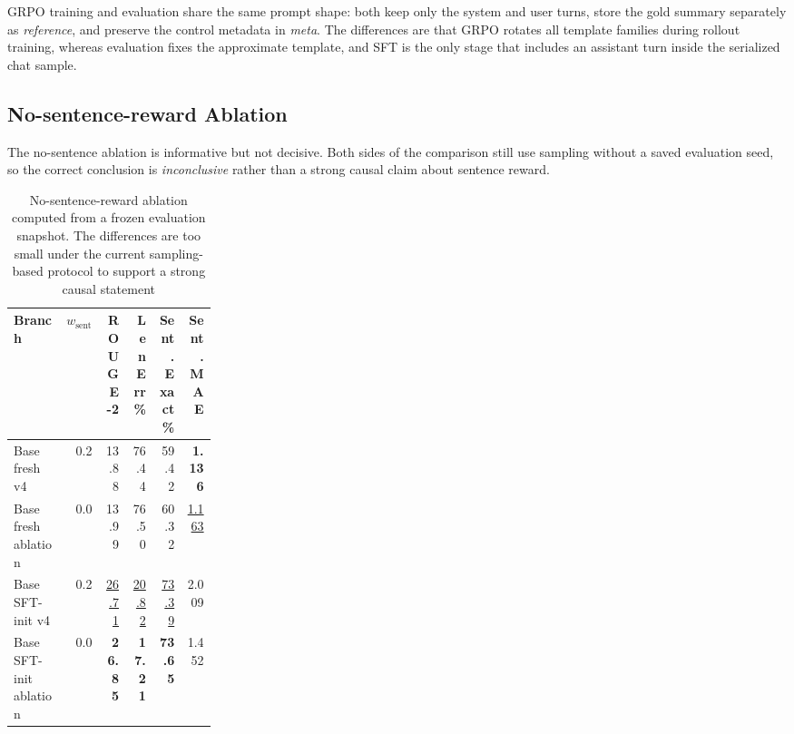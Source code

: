 \documentclass[11pt]{article}
\newcommand{\best}[1]{\textbf{#1}}
\newcommand{\second}[1]{\underline{#1}}
\begin{document}
GRPO training and evaluation share the same prompt shape: both keep only the system and user turns, store the gold summary separately as \textit{reference}, and preserve the control metadata in \textit{meta}.
The differences are that GRPO rotates all template families during rollout training, whereas evaluation fixes the approximate template, and SFT is the only stage that includes an assistant turn inside the serialized chat sample.

\subsection{No-sentence-reward Ablation}
\label{sec:appendix-nosentence}
The no-sentence ablation is informative but not decisive.
Both sides of the comparison still use sampling without a saved evaluation seed, so the correct conclusion is \emph{inconclusive} rather than a strong causal claim about sentence reward.

\begin{table}[H]
\centering
\caption{No-sentence-reward ablation computed from a frozen evaluation snapshot. The differences are too small under the current sampling-based protocol to support a strong causal statement}
\label{tab:appendix-nosentence}
\small
\begin{tabular}{L{0.26\linewidth}rrrrr}
\toprule
Branch & $w_{\mathrm{sent}}$ & ROUGE-2 & LenErr\% & Sent. Exact\% & Sent. MAE \\
\midrule
Base fresh v4 & 0.2 & 13.88 & 76.44 & 59.42 & \best{1.136} \\
Base fresh ablation & 0.0 & 13.99 & 76.50 & 60.32 & \second{1.163} \\
Base SFT-init v4 & 0.2 & \second{26.71} & \second{20.82} & \second{73.39} & 2.009 \\
Base SFT-init ablation & 0.0 & \best{26.85} & \best{17.21} & \best{73.65} & 1.452 \\
\bottomrule
\end{tabular}
\end{table}
\end{document}
